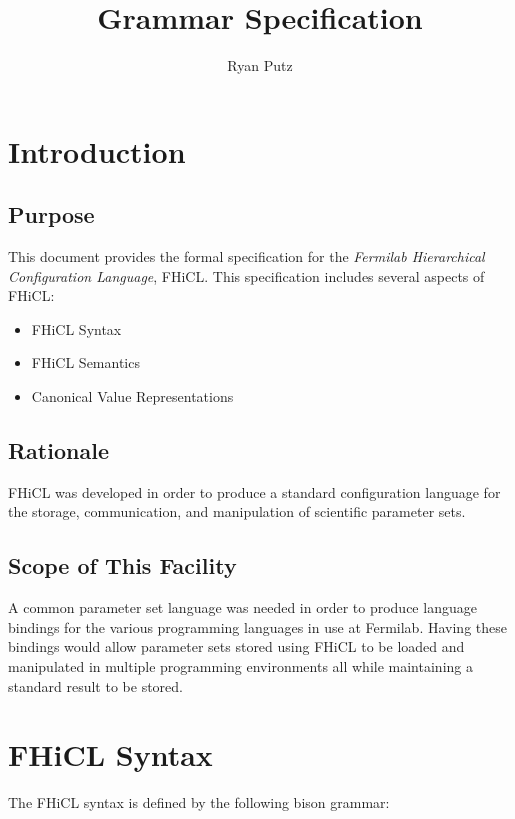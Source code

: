 \documentclass{article}
\begin{document}
\setlength{\parindent}{0in}
\title{Grammar Specification}
\author{Ryan Putz}
\maketitle
\newpage

\tableofcontents
\newpage

\section{Introduction}
	\subsection{Purpose}
	{
		This document provides the formal specification
		for the \emph{Fermilab Hierarchical Configuration Language}, FHiCL.
		This specification includes several aspects of FHiCL:
		\begin{itemize}
			\item FHiCL Syntax
			\item FHiCL Semantics
			\item Canonical Value Representations
		\end{itemize}
	}

	\subsection{Rationale}
	{
		FHiCL was developed in order to produce
		a standard configuration language for the storage,
		communication, 
		and manipulation
		of scientific parameter sets.
	}
	
	\subsection{Scope of This Facility}
	{
		A common parameter set language was needed 
		in order to produce language bindings 
		for the various programming languages in use 
		at Fermilab.
		Having these bindings would allow parameter sets
		stored using FHiCL
		to be loaded 
		and manipulated in multiple programming environments
		all while maintaining a standard result to be stored.
	}
	\newpage	
\section{FHiCL Syntax}
	The FHiCL syntax is defined by the following bison grammar:
	\begin{verbatim}
		
	\end{verbatim}
\end{document}
